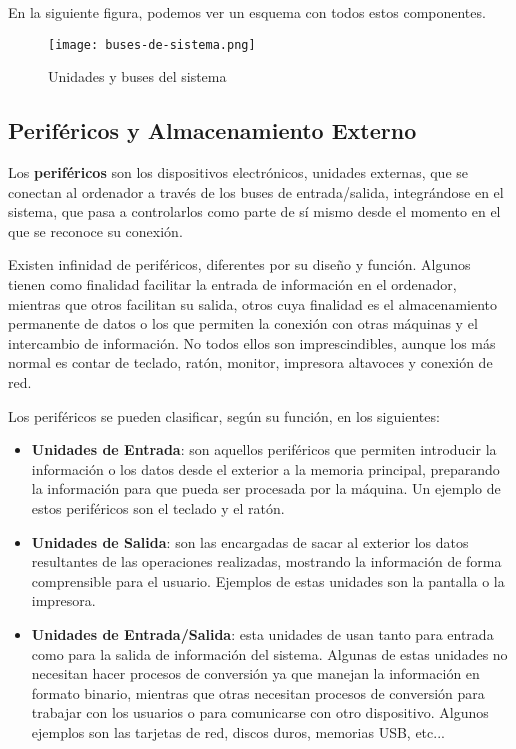 En la siguiente figura, podemos ver un esquema con todos estos componentes.

\begin{figure}[ht]
    \centering
    \texttt{[image: buses-de-sistema.png]}
    \caption{Unidades y buses del sistema}
\end{figure}

\subsection{Periféricos y Almacenamiento Externo}
Los \textbf{periféricos} son los dispositivos electrónicos, unidades externas, que se conectan al ordenador a través de los buses de entrada/salida, integrándose en el sistema, que pasa a controlarlos como parte de sí mismo desde el momento en el que se reconoce su conexión.

Existen infinidad de periféricos, diferentes por su diseño y función. Algunos tienen como finalidad facilitar la entrada de información en el ordenador, mientras que otros facilitan su salida, otros cuya finalidad es el almacenamiento permanente de datos o los que permiten la conexión con otras máquinas y el intercambio de información. No todos ellos son imprescindibles, aunque los más normal es contar de teclado, ratón, monitor, impresora altavoces y conexión de red.

Los periféricos se pueden clasificar, según su función, en los siguientes:

\begin{itemize}
    \item \textbf{Unidades de Entrada}: son aquellos periféricos que permiten introducir la información o los datos desde el exterior a la memoria principal, preparando la información para que pueda ser procesada por la máquina. Un ejemplo de estos periféricos son el teclado y el ratón.
    \item \textbf{Unidades de Salida}: son las encargadas de sacar al exterior los datos resultantes de las operaciones realizadas, mostrando la información de forma comprensible para el usuario. Ejemplos de estas unidades son la pantalla o la impresora.
    \item \textbf{Unidades de Entrada/Salida}: esta unidades de usan tanto para entrada como para la salida de información del sistema. Algunas de estas unidades no necesitan hacer procesos de conversión ya que manejan la información en formato binario, mientras que otras necesitan procesos de conversión para trabajar con los usuarios o para comunicarse con otro dispositivo. Algunos ejemplos son las tarjetas de red, discos duros, memorias USB, etc...
\end{itemize}

